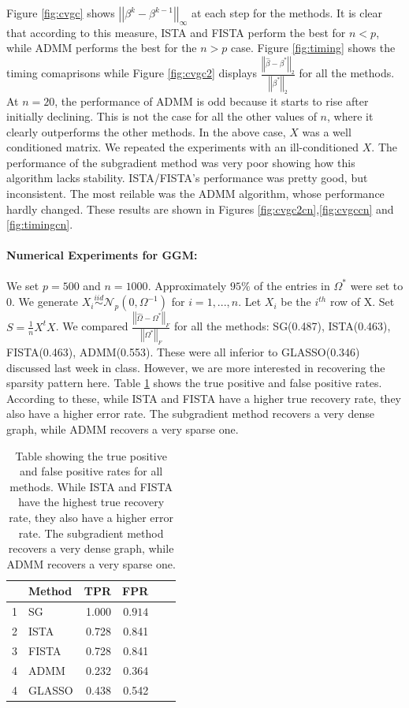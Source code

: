 \documentclass[12pt, leqno]{article}
\newcommand{\norm}[1]{\left|\left|#1\right|\right|}
\theoremstyle{remark}
\begin{document}
Figure \ref{fig:cvgc} shows $\norm{\beta^k - \beta^{k-1}}_\infty$ at each step for the methods. It is clear that according to this measure, ISTA and FISTA perform the best for $n<p$, while ADMM performs the best for the $n>p$ case. Figure \ref{fig:timing} shows the timing comaprisons while Figure \ref{fig:cvgc2} displays $\frac{\norm{\hat{\beta}-\beta^*}_2}{\norm{\beta^*}_2}$ for all the methods. At $n=20$, the performance of ADMM is odd because it starts to rise after initially declining. This is not the case for all the other values of $n$, where it clearly outperforms the other methods. In the above case, $X$ was a well conditioned matrix. We repeated the experiments with an ill-conditioned $X$. The performance of the subgradient method was very poor showing how this algorithm lacks stability. ISTA/FISTA's performance was pretty good, but inconsistent. The most reilable was the ADMM algorithm, whose performance hardly changed. These results are shown in Figures  \ref{fig:cvgc2cn},\ref{fig:cvgccn} and \ref{fig:timingcn}.

\paragraph{Numerical Experiments for GGM:} We set $p = 500$ and $n = 1000$. Approximately $95\%$ of the entries in $\Omega^*$ were set to 0. We generate $X_i \overset{iid}{\sim} \mathcal{N}_p(0, \Omega^{-1})$ for $i = 1,...,n$. Let $X_i$ be the $i^{th}$ row of X. Set $S = \frac{1}{n} X^t X$. We compared  $\frac{\norm{\hat{\Omega}-\Omega^*}_F}{\norm{\Omega^*}_F}$ for all the methods: SG(0.487), ISTA(0.463), FISTA(0.463), ADMM(0.553). These were all inferior to GLASSO(0.346) discussed last week in class. However, we are more interested in recovering the sparsity pattern here. Table \ref{tprfpr} shows the true positive and false positive rates. According to these, while ISTA and FISTA have a higher true recovery rate, they also have a higher error rate. The subgradient method recovers a very dense graph, while ADMM recovers a very sparse one.

\begin{table}[H]
\centering
\begin{tabular}{rlrrrr}
  \hline
 & Method & TPR & FPR  \\ 
  \hline
1 & SG & 1.000 & $0.914$ \\ 
  2 & ISTA& 0.728 & 0.841 \\ 
  3 & FISTA & 0.728& 0.841 \\ 
  4 & ADMM & 0.232 & 0.364 \\ 
  4 & GLASSO & 0.438 & 0.542 \\ 
   \hline
\end{tabular}
\caption{Table showing the true positive and false positive rates for all methods. While ISTA and FISTA have the highest true recovery rate, they also have a higher error rate. The subgradient method recovers a very dense graph, while ADMM recovers a very sparse one.}
\label{tprfpr}
\end{table}
\end{document}
